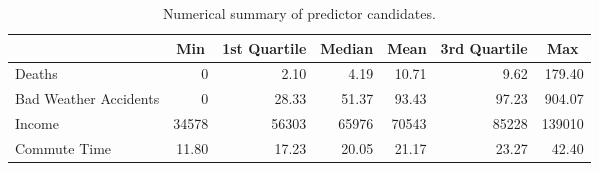 \begin{table}[h!]
\centering
\begin{tabular}{|l|r|r|r|r|r|r|}
\hline
\rowcolor[HTML]{E7EAF6} 
\multicolumn{1}{|c|}{\textbf{Predictor}} & \multicolumn{1}{c|}{Min} & \multicolumn{1}{c|}{1st Quartile} & \multicolumn{1}{c|}{Median} & \multicolumn{1}{c|}{Mean} & \multicolumn{1}{c|}{3rd Quartile} & \multicolumn{1}{c|}{Max} \\ \hline
Deaths & 0 & 2.10 & 4.19 & 10.71 & 9.62 & 179.40 \\ \hline
Bad Weather Accidents & 0 & 28.33 & 51.37 & 93.43 & 97.23 & 904.07 \\ \hline
Income & 34578 & 56303 & 65976 & 70543 & 85228 & 139010 \\ \hline
Commute Time & 11.80 &  17.23 & 20.05 & 21.17 & 23.27 & 42.40 \\ \hline
\end{tabular}
\caption{Numerical summary of predictor candidates.}
\end{table}

